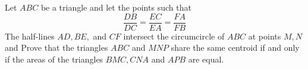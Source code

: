 Let $ABC$ be a triangle and let the points  such that                                                                                     \[ \frac{DB}{DC}=\frac{EC}{EA}=\frac{FA}{FB} \]
The half-lines $AD, BE,$ and $CF$ intersect the circumcircle of $ABC$ at points $M,N$ and  Prove that the triangles $ABC$ and $MNP$ share the same centroid if and only if the areas of the triangles $BMC, CNA$ and $APB$ are equal.